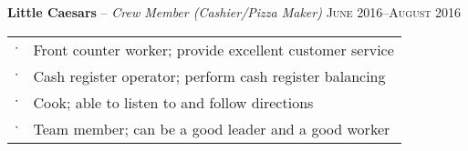 \documentclass[letterpaper,12pt]{article}
\begin{document}
\textbf{Little Caesars} -- \textit{Crew Member (Cashier/Pizza Maker)} \hfill \textsc{June 2016--August 2016}

\begin{tabular}{rl}
$\cdot$ & Front counter worker; provide excellent customer service \\
$\cdot$ & Cash register operator; perform cash register balancing \\
$\cdot$ & Cook; able to listen to and follow directions \\
$\cdot$ & Team member; can be a good leader and a good worker \\
\end{tabular}
\end{document}
